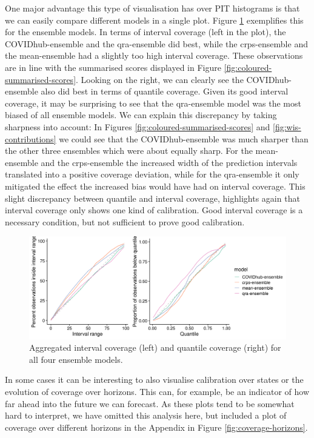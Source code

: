 \documentclass[
]{book}
\begin{document}
One major advantage this type of visualisation has over PIT histograms is that we can easily compare different models in a single plot. Figure \ref{fig:coverage-ensemble} exemplifies this for the ensemble models. In terms of interval coverage (left in the plot), the COVIDhub-ensemble and the qra-ensemble did best, while the crps-ensemble and the mean-ensemble had a slightly too high interval coverage. These observations are in line with the summarised scores displayed in Figure \ref{fig:coloured-summarised-scores}. Looking on the right, we can clearly see the COVIDhub-ensemble also did best in terms of quantile coverage. Given its good interval coverage, it may be surprising to see that the qra-ensemble model was the most biased of all ensemble models. We can explain this discrepancy by taking sharpness into account: In Figures \ref{fig:coloured-summarised-scores} and \ref{fig:wis-contributions} we could see that the COVIDhub-ensemble was much sharper than the other three ensembles which were about equally sharp. For the mean-ensemble and the crps-ensemble the increased width of the prediction intervals translated into a positive coverage deviation, while for the qra-ensemble it only mitigated the effect the increased bias would have had on interval coverage. This slight discrepancy between quantile and interval coverage, highlights again that interval coverage only shows one kind of calibration. Good interval coverage is a necessary condition, but not sufficient to prove good calibration.

\begin{figure}
\includegraphics[width=1\linewidth]{../visualisation/chapter-5-results/coverage_ensemble} \caption{Aggregated interval coverage (left) and quantile coverage (right) for all four ensemble models.}\label{fig:coverage-ensemble}
\end{figure}

In some cases it can be interesting to also visualise calibration over states or the evolution of coverage over horizons. This can, for example, be an indicator of how far ahead into the future we can forecast. As these plots tend to be somewhat hard to interpret, we have omitted this analysis here, but included a plot of coverage over different horizons in the Appendix in Figure \ref{fig:coverage-horizons}.
\end{document}
